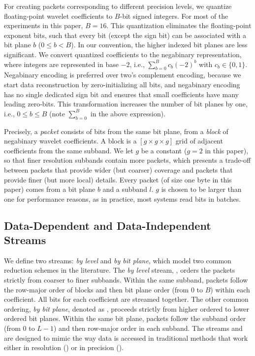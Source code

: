 For creating packets corresponding to different precision levels, we quantize floating-point wavelet
coefficients to $B$-bit signed integers. For most of the experiments in this paper, $B=16$. This
quantization eliminates the floating-point exponent bits, such that every bit (except the sign bit)
can be associated with a bit plane $b$ ($0\leq b < B$). In our convention, the higher indexed bit
planes are less significant. We convert quantized coefficients to the negabinary representation,
where integers are represented in base $-2$, i.e., $\sum_{b=0}^{B}{c_b(-2)^b}$ with $c_b\in
\{0,1\}$. Negabinary encoding is preferred over two's complement encoding, because we start data
reconstruction by zero-initializing all bits, and negabinary encoding has no single dedicated sign
bit and ensures that small coefficients have many leading zero-bits.
%
This transformation increases the number of bit planes by one, i.e., $0\leq b \leq B$ 
(note $\sum_{b=0}^{B}$ in the above expression).

Precisely, a \emph{packet} consists of bits from the same bit plane, from a \emph{block} of
negabinary wavelet coefficients. A block is a $[g\times g\times g]$ grid of adjacent coefficients
from the same subband. We let $g$ be a constant ($g=2$ in this paper), so that finer resolution
subbands contain more packets, which presents a trade-off between packets that provide wider (but
coarser) coverage and packets that provide finer (but more local) details. Every packet (of size one
byte in this paper) comes from a bit plane $b$ and a subband $l$. $g$ is chosen to be larger than
one for performance reasons, as in practice, most systems read bits in batches.

\subsection{Data-Dependent and Data-Independent Streams} \label{sec:static-dynamic-streams}

We define two streams: \emph{by level} and \emph{by bit plane}, which model two common reduction
schemes in the literature. The \emph{by level} stream, \slvl, orders the packets strictly from
coarser to finer subbands. Within the same subband, packets follow the row-major order of blocks and
then bit plane order (from 0 to $B$) within each coefficient. All bits for each coefficient are
streamed together. The other common ordering, \emph{by bit plane}, denoted as \sbit, proceeds
strictly from higher ordered to lower ordered bit planes. Within the same bit plane, packets follow
the subband order (from $0$ to $L-1$) and then row-major order in each subband. The streams \slvl
and \sbit are designed to mimic the way data is accessed in traditional methods that work either in
resolution (\slvl) or in precision (\sbit).

